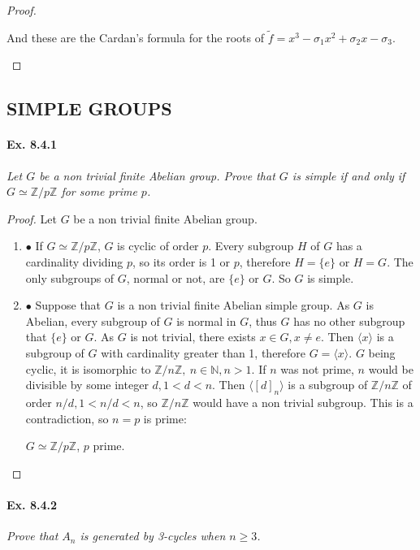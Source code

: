 \documentclass[11pt,a4paper]{article}
\newcommand{\be} {\begin{enumerate}}
\newcommand{\ee} {\end{enumerate}}
\newcommand{\Z}{\mathbb{Z}}
\newcommand{\N}{\mathbb{N}}
\begin{document}
\begin{proof}
\begin{enumerate}
And these are the Cardan's formula for the roots of $\tilde{f} = x^3 - \sigma_1 x^2+\sigma_2 x -\sigma_3$.
\end{enumerate}
\end{proof}

\subsection{SIMPLE GROUPS}

\paragraph{Ex. 8.4.1}

{\it Let $G$ be a non trivial finite Abelian group. Prove that $G$ is simple if and only if $G\simeq \Z/p\Z$ for some prime $p$.
}

\begin{proof}
Let $G$ be a non trivial finite Abelian group.
\be
\item[$\bullet$] If $G \simeq \Z/p\Z$, $G$ is cyclic of order $p$. Every subgroup $H$ of $G$ has a cardinality dividing $p$, so its order is 1 or $p$, therefore $H = \{e\}$ or $H = G$. The only subgroups of $G$, normal or not, are $\{e\}$ or $G$. So $G$ is simple.

\item[$\bullet$] Suppose that $G$ is a non trivial finite Abelian simple group. As $G$ is Abelian, every subgroup of $G$ is normal in $G$, thus $G$ has no other subgroup that $\{e\}$ or $G$. As $G$ is not trivial, there exists $x \in G, x\neq e$. Then $\langle x \rangle$ is a subgroup of $G$ with cardinality greater than 1, therefore $G = \langle x \rangle$. $G$ being cyclic, it is isomorphic to $\Z/n\Z,\ n\in \N, n>1$. If  $n$ was not prime, $n$ would be divisible by some integer $d, 1<d<n$. Then $\langle [d]_n \rangle$ is a subgroup of $\Z/n\Z$ of order $n/d, 1<n/d<n$, so $\Z/n\Z$ would have a non trivial subgroup. This is a contradiction, so $n=p$ is prime:
\begin{center}
$G\simeq \Z/p\Z$, $p$ prime. 
\end{center}
\ee
\end{proof}

\paragraph{Ex. 8.4.2}

{\it Prove that $A_n$ is generated by 3-cycles when $n\geq 3$.
}
\end{document}
